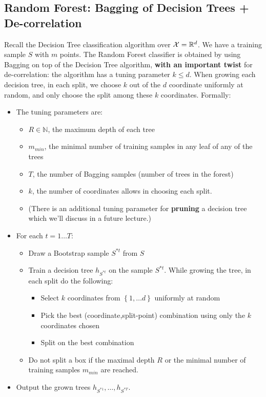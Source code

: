 \documentclass[11pt]{article}
\newcommand{\R}{\ensuremath{\mathbb{R}}}
\begin{document}
\subsection{Random Forest: Bagging of Decision Trees + De-correlation}

Recall the Decision Tree classification algorithm over $\X=\R^d$. We have a
training sample $S$ with $m$ points. 
The Random Forest classifier is obtained by using Bagging on top of 
the Decision Tree algorithm, {\bf with an important
twist} for de-correlation: the algorithm has a tuning parameter $k\leq d$. When
growing each decision tree, in each split, we choose $k$ out of the $d$
coordinate uniformly at random, and only choose the split among these $k$
coordinates. Formally:

\begin{itemize}
  \item The tuning parameters are:
    
    \begin{itemize}
      \item $R\in \mathbb{N}$, the maximum depth of each
    tree
  \item  $m_{min}$, the minimal number of training samples in any leaf of any
    of the trees
  \item $T$, the number of Bagging samples (number of trees in the
    forest)
  \item $k$, the number of coordinates allows in choosing each split.
  \item  (There is an additional tuning parameter for {\bf pruning} a decision tree
    which we'll discuss in a future lecture.) 
    \end{itemize}
  \item For each $t=1\ldots T$:
    \begin{itemize}
      \item Draw a Bootstrap sample $S^{*t}$ from $S$
      \item Train a decision tree $h_{S^{*t}}$ on the sample  $S^{*t}$. While
        growing the tree, in each
        split do the following:
        \begin{itemize}
          \item Select $k$ coordinates from $\left\{ 1,\ldots d \right\}$
            uniformly at random
          \item Pick the best (coordinate,split-point) combination using only
            the $k$ coordinates chosen
          \item Split on the best combination 
        \end{itemize}
      \item Do not split a box if the maximal depth $R$ or the minimal number of
        training samples $m_{min}$ are reached.
    \end{itemize}
  \item Output the grown trees $h_{S^{*1}},\ldots ,h_{S^{*T}}$.
   \end{itemize}
\end{document}
